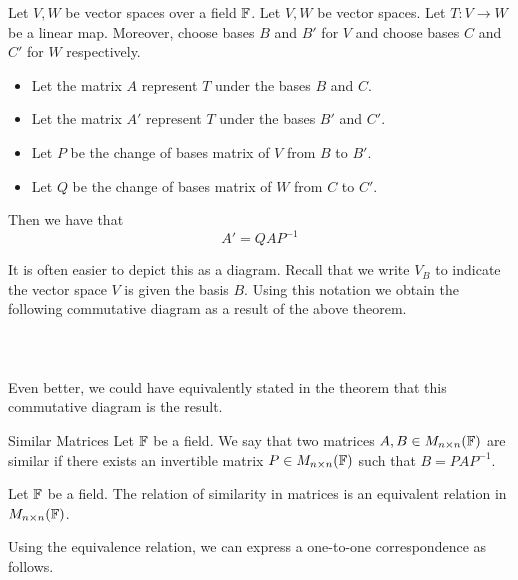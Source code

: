 \documentclass[a4paper]{article}
\begin{document}
\begin{thm}{}{} Let $V,W$ be vector spaces over a field $\mathbb{F}$. Let $V,W$ be vector spaces. Let $T:V\to W$ be a linear map. Moreover, choose bases $B$ and $B'$ for $V$ and choose bases $C$ and $C'$ for $W$ respectively. 
\begin{itemize}
\item Let the matrix $A$ represent $T$ under the bases $B$ and $C$. 
\item Let the matrix $A'$ represent $T$ under the bases $B'$ and $C'$. 
\item Let $P$ be the change of bases matrix of $V$ from $B$ to $B'$. 
\item Let $Q$ be the change of bases matrix of $W$ from $C$ to $C'$. 
\end{itemize}
Then we have that $$A'=QAP^{-1}$$
\end{thm}

It is often easier to depict this as a diagram. Recall that we write $V_B$ to indicate the vector space $V$ is given the basis $B$. Using this notation we obtain the following commutative diagram as a result of the above theorem. \\~\\
\\~\\
Even better, we could have equivalently stated in the theorem that this commutative diagram is the result. 

\begin{defn}{Similar Matrices}{} Let $\mathbb{F}$ be a field. We say that two matrices $A,B\in M_{n\times n}(\mathbb{F})$ are similar if there exists an invertible matrix $P\in M_{n\times n}(\mathbb{F})$ such that $B=PAP^{-1}$. 
\end{defn}

\begin{lmm}{}{} Let $\mathbb{F}$ be a field. The relation of similarity in matrices is an equivalent relation in $M_{n\times n}(\mathbb{F})$. 
\end{lmm}

Using the equivalence relation, we can express a one-to-one correspondence as follows. 
\end{document}
